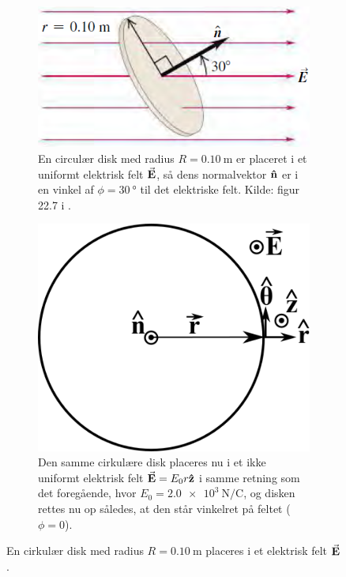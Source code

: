 \begin{figure}[t]
    \centering
    \begin{subfigure}[t]{.45\textwidth}
        \centering
        \includegraphics[width=\columnwidth]{Elektro/Figurer/ElectricFluxThroughADisk.PNG}
        \caption{En circulær disk med radius $R = \SI{0.10}{\meter}$ er placeret i et uniformt elektrisk felt $\va{E}$, så dens normalvektor $\vu{n}$ er i en vinkel af $\phi = \SI{30}{\degree}$ til det elektriske felt. Kilde: figur 22.7 i \cite{youngSearsZemanskyUniversity2016}.}
        \label{fig:ElectricFluxThrougADisk}
    \end{subfigure}
    \hfill
    \begin{subfigure}[t]{.45\textwidth}
        \centering
        \includegraphics[width=.65\columnwidth]{Elektro/Figurer/ElectricFluxExercise.png}
        \caption{Den samme cirkulære disk placeres nu i et ikke uniformt elektrisk felt $\va{E} = E_0 r \vu{z}$ i samme retning som det foregående, hvor $E_0 = \SI{2.0e3}{\newton/\coulomb}$, og disken rettes nu op således, at den står vinkelret på feltet ($\phi = 0$).}
        \label{fig:ElectricFluxThrougADisk2}
    \end{subfigure}
    \caption{En cirkulær disk med radius $R = \SI{0.10}{\meter}$ placeres i et elektrisk felt $\va{E}$.}
    \label{fig:ElectrixFluxExample}
\end{figure}


